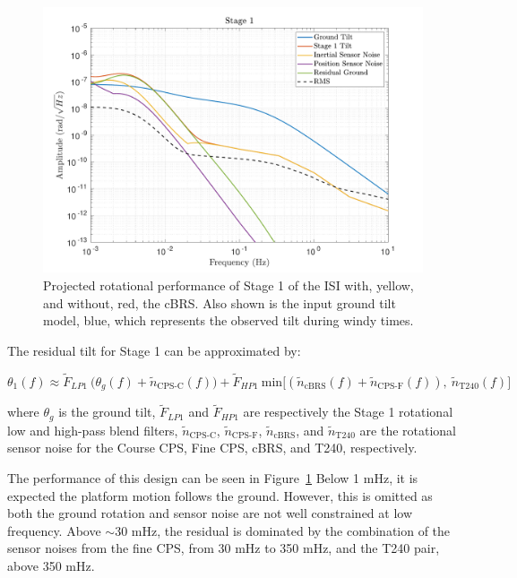 \documentclass [12pt, proquest]{uwthesis}[2019]
\begin{document}
\begin{figure}[!h]
\begin{center}
\includegraphics[width=\textwidth]{cBRS_Model_ST1RX.pdf}
\caption[Projected rotational performance of Stage 1 of the ISI]{Projected rotational performance of Stage 1 of the ISI with, yellow, and without, red, the cBRS. Also shown is the input ground tilt model, blue, which represents the observed tilt during windy times.}
\label{cBRS1R}
\end{center}
\end{figure}

The residual tilt for Stage 1 can be approximated by:

\begin{equation}
\theta_1(f)\approx \tilde{F}_{LP1}\ \big(\theta_g(f)+\tilde{n}_\text{CPS-C}(f)\big)+\tilde{F}_{HP1}\ \text{min}\big[(\tilde{n}_\text{cBRS}(f)+\tilde{n}_\text{CPS-F}(f)),\ \tilde{n}_\text{T240}(f)\big]
\end{equation}

where $\theta_g$ is the ground tilt, $\tilde{F}_{LP1}$ and $\tilde{F}_{HP1}$ are respectively the Stage 1 rotational low and high-pass blend filters, $\tilde{n}_\text{CPS-C}$, $\tilde{n}_\text{CPS-F}$, $\tilde{n}_\text{cBRS}$, and $\tilde{n}_\text{T240}$ are the rotational sensor noise for the Course CPS, Fine CPS, cBRS, and T240, respectively.

The performance of this design can be seen in Figure~\ref{cBRS1R} Below 1 mHz, it is expected the platform motion follows the ground. However, this is omitted as both the ground rotation and sensor noise are not well constrained at low frequency. Above $\sim$30 mHz, the residual is dominated by the combination of the sensor noises from the fine CPS, from 30 mHz to 350 mHz, and the T240 pair, above 350 mHz.
\end{document}
